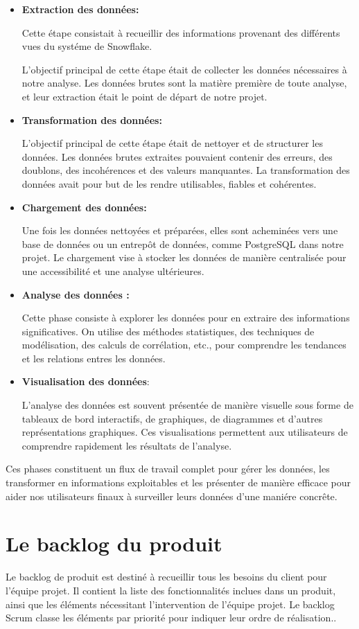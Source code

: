   \begin{itemize}
  \item \textbf{Extraction des données: }
  \par Cette étape consistait à recueillir des informations provenant des différents vues du systéme de Snowflake.
\par L'objectif principal de cette étape était de collecter les données nécessaires à notre analyse. Les données brutes sont la matière première de toute analyse, et leur extraction était le point de départ de notre projet.
  \item \textbf{Transformation des données:}
  \par L'objectif principal de cette étape était de nettoyer et de structurer les données. Les données brutes extraites pouvaient contenir des erreurs, des doublons, des incohérences et des valeurs manquantes. La transformation des données avait pour but de les rendre utilisables, fiables et cohérentes.
   \item \textbf{Chargement des données:}
  \par Une fois les données nettoyées et préparées, elles sont acheminées vers une base de données ou un entrepôt de données, comme PostgreSQL dans notre projet. Le chargement vise à stocker les données de manière centralisée pour une accessibilité et une analyse ultérieures.
   \item \textbf{Analyse des données :}
  \par Cette phase consiste à explorer les données pour en extraire des informations significatives. On utilise des méthodes statistiques, des techniques de modélisation, des calculs de corrélation, etc., pour comprendre les tendances et les relations entres les données.
   \item \textbf{Visualisation des données}:
  \par L'analyse des données est souvent présentée de manière visuelle sous forme de tableaux de bord interactifs, de graphiques, de diagrammes et d'autres représentations graphiques. Ces visualisations permettent aux utilisateurs de comprendre rapidement les résultats de l'analyse.
  \end{itemize}
  \par Ces phases constituent un flux de travail complet pour gérer les données, les transformer en informations exploitables et les présenter de manière efficace pour aider nos utilisateurs finaux à surveiller leurs données d'une maniére concrête.
\section{Le backlog du produit}
\par Le backlog de produit est destiné à recueillir tous les besoins du client pour l'équipe projet. Il contient la liste des fonctionnalités inclues dans un produit, ainsi que les éléments nécessitant l’intervention de l’équipe projet. Le backlog Scrum classe les éléments par priorité pour indiquer leur ordre de réalisation.\cite{blog}.


